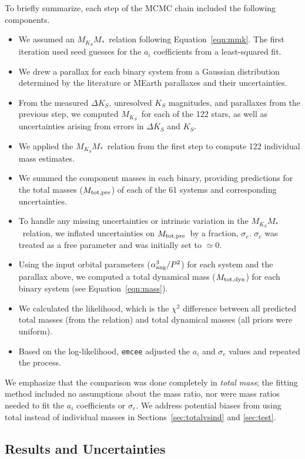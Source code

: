 \documentclass[twocolumn]{aastex62}
\newcommand{\mks}{$M_{K_S}$}
\newcommand{\mmk}{$M_{K_S}$\textendash$M_*$}
\newcommand{\mpred}{$M_{\rm{tot,pre}}$}
\newcommand{\mdyn}{$M_{\rm{tot,dyn}}$}
\begin{document}
To briefly summarize, each step of the MCMC chain included the following components. 
\begin{itemize}
\item We assumed an \mmk\ relation following Equation~\ref{eqn:mmk}. The first iteration used seed guesses for the $a_i$ coefficients from a least-squared fit. 
\item We drew a parallax for each binary system from a Gaussian distribution determined by the literature or MEarth parallaxes and their uncertainties.
\item From the measured $\Delta K_S$, unresolved $K_S$ magnitudes, and parallaxes from the previous step, we computed \mks\ for each of the 122 stars, as well as uncertainties arising from errors in $\Delta K_S$ and $K_S$.
\item We applied the \mmk\ relation from the first step to compute 122 individual mass estimates.
\item We summed the component masses in each binary, providing predictions for the total masses (\mpred) of each of the 61 systems and corresponding uncertainties.
\item To handle any missing uncertainties or intrinsic variation in the \mmk\ relation, we inflated uncertainties on \mpred\ by a fraction, $\sigma_e$. $\sigma_e$ was treated as a free parameter and was initially set to $\simeq$0. 
\item Using the input orbital parameters ($\alpha_{\rm{ang}}^3/P^2$) for each system and the parallax above, we computed a total dynamical mass (\mdyn) for each binary system (see Equation~\ref{eqn:mass}). 
\item We calculated the likelihood, which is the $\chi^2$ difference between all predicted total masses (from the relation) and total dynamical masses (all priors were uniform).
\item Based on the log-likelihood, {\tt emcee} adjusted the $a_i$ and $\sigma_e$ values and repeated the process.
\end{itemize}
We emphasize that the comparison was done completely in {\it total mass}; the fitting method included no assumptions about the mass ratio, nor were mass ratios needed to fit the $a_i$ coefficients or $\sigma_e$. We address potential biases from using total instead of individual masses in Sections~\ref{sec:totalvsind} and \ref{sec:test}.

\subsection{Results and Uncertainties}\label{sec:res}
\end{document}
